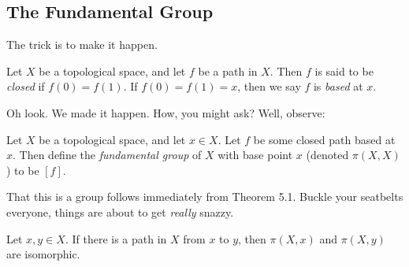 \documentclass[nocover]{pset}
\begin{document}
\begin{adjustwidth}{1em}{1em}
  \subsection{The Fundamental Group}
  The trick is to make it happen.
  \begin{definition}
    Let $X$ be a topological space, and let $f$ be a path in $X$. Then
    $f$ is said to be \emph{closed} if $f(0) = f(1)$. If $f(0) = f(1)
    = x$, then we say $f$ is \emph{based} at $x$.
  \end{definition}
  Oh look. We made it happen. How, you might ask? Well, observe:
  \begin{definition}
    Let $X$ be a topological space, and let $x \in X$. Let $f$ be some
    closed path based at $x$. Then define the \emph{fundamental group}
    of $X$ with base point $x$ (denoted $\pi(X,X)$) to be $[f]$.
  \end{definition}
  That this is a group follows immediately from Theorem 5.1. Buckle
  your seatbelts everyone, things are about to get \emph{really}
  snazzy.
  \begin{theorem}
    Let $x,y \in X$. If there is a path in $X$ from $x$ to $y$, then
    $\pi(X,x)$ and $\pi(X,y)$ are isomorphic.
  \end{theorem}

\end{adjustwidth}
\end{document}
